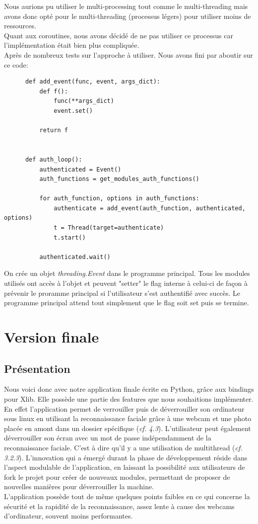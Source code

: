 \documentclass[french]{report}
\begin{document}
Nous aurions pu utiliser le multi-processing tout comme le multi-threading mais avons donc
opté pour le multi-threading (processus légers) pour utiliser moins de ressources.\\
Quant aux coroutines, nous avons décidé de ne pas utiliser ce processus car l'implémentation
était bien plus compliquée.
\\
Après de nombreux tests sur l'approche à utiliser. Nous avons fini par aboutir sur ce code:

  \begin{verbatim}
      def add_event(func, event, args_dict):
          def f():
              func(**args_dict)
              event.set()

          return f


      def auth_loop():
          authenticated = Event()
          auth_functions = get_modules_auth_functions()

          for auth_function, options in auth_functions:
              authenticate = add_event(auth_function, authenticated, options)
              t = Thread(target=authenticate)
              t.start()

          authenticated.wait()
    \end{verbatim}

On crée un objet \emph{threading.Event} dans le programme principal. Tous les modules
utilisés ont accès à l'objet et peuvent "setter" le flag interne à celui-ci de façon
à prévenir le proramme principal si l'utilisateur s'est authentifié avec succès.
Le programme principal attend tout simplement que le flag soit set puis se termine.

\chapter{Version finale}

\newpage

\section{Présentation}
Nous voici donc avec notre application finale écrite en Python, grâce aux bindings
pour Xlib. Elle possède une partie des features que nous souhaitions
implémenter. En effet l'application permet de verrouiller puis de déverrouiller son ordinateur sous linux
en utilisant la reconnaissance faciale grâce à une webcam et une photo placée
en amont dans un dossier spécifique (\emph{cf. 4.3}). L'utilisateur peut également déverrouiller
son écran avec un mot de passe indépendamment de la reconnaissance faciale. C'est
à dire qu'il y a une utilisation de multithread (\emph{cf. 3.2.3}).
L'innovation qui a émergé durant la phase de développement réside dans
l'aspect modulable de l'application, en laissant la possibilité aux utilisateurs
de fork le projet pour créer de nouveaux modules, permettant de proposer de nouvelles manières pour
déverrouiller la machine.\\
L'application possède tout de même quelques points faibles en ce qui concerne la
sécurité et la rapidité de la reconnaissance, assez lente à cause des webcams
d'ordinateur, souvent moins performantes.
\end{document}
